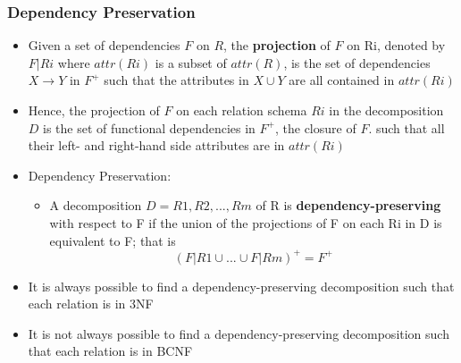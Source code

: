\subsubsection{Dependency Preservation}
\begin{itemize}[label=\(\rhd\)]
    \item Given a set of dependencies $F$ on $R$, the \textbf{projection} of $F$ on Ri, denoted by $F|Ri$ where $attr(Ri)$ is a subset of $attr(R)$, is the set of dependencies $X\rightarrow Y$ in $F^+$ such that the attributes in $X \cup Y$ are all contained in $attr(Ri)$
    \item Hence, the projection of $F$ on each relation schema $Ri$ in the decomposition $D$ is the set of functional dependencies in $F^+$, the closure of $F$. such that all their left- and right-hand side attributes are in $attr(Ri)$
    \item Dependency Preservation:
    \begin{itemize}[label=\(\rhd\)]
        \item A decomposition $D=R1,R2,...,Rm$ of R is \textbf{dependency-preserving} with respect to F if the union of the projections of F on each Ri in D is equivalent to F; that is \[
        (F|R1 \cup ...\cup F|Rm)^+ = F^+
        \]
    \end{itemize}
    \item It is always possible to find a dependency-preserving decomposition such that each relation is in 3NF
    \item It is not always possible to find a dependency-preserving decomposition such that each relation is in BCNF
\end{itemize}

